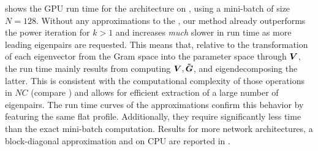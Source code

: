  shows the GPU run time
for the \threecthreed architecture on \cifarten, using a mini-batch of size
$N=128$. Without any approximations to the \ggn, our method already outperforms
the power iteration for $k>1$ and increases \textit{much} slower in run time as
more leading eigenpairs are requested. This means that, relative to the
transformation of each eigenvector from the Gram space into the parameter space
through ${\bm{V}}$, the run time mainly results from computing ${\bm{V}},\bm{\tilde{{\bm{G}}}}$, and
eigendecomposing the latter. This is consistent with the computational
complexity of those operations in $NC$ (compare
) and allows for efficient extraction of a
large number of eigenpairs. The run time curves of the approximations confirm
this behavior by featuring the same flat profile. Additionally, they require
significantly less time than the exact mini-batch computation. Results for more
network architectures, a block-diagonal approximation and on CPU are reported in
.

